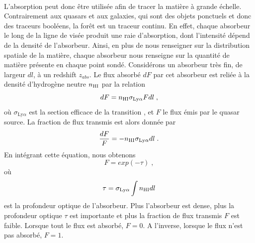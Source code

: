 \documentclass[11pt, twoside, a4paper, openright]{report}
\begin{document}
\paragraph{}
L'absorption \lya{} peut donc être utilisée afin de tracer la matière à grande échelle. Contrairement aux quasars et aux galaxies, qui sont des objets ponctuels et donc des traceurs booléens, la forêt \lya{} est un traceur continu. En effet, chaque absorbeur le long de la ligne de visée produit une raie d'absorption, dont l'intensité dépend de la densité de l'absorbeur. Ainsi, en plus de nous renseigner sur la distribution spatiale de la matière, chaque absorbeur nous renseigne sur la quantité de matière présente en chaque point sondé.
Considérons un absorbeur très fin, de largeur $dl$, à un redshift $z_{abs}$. Le flux absorbé $dF$ par cet absorbeur est reliée à la densité d'hydrogène neutre $n_{\textsc{HI}}$ par la relation
\begin{equation}
  dF = n_{\textsc{HI}} \sigma_{\mathrm{Ly}\alpha} F dl  \; ,
\end{equation}
où $\sigma_{\mathrm{Ly}\alpha}$ est la section efficace de la transition \lya{}, et $F$ le flux émis par le quasar source.
La fraction de flux transmis est alors donnée par
\begin{equation}
 \frac{dF}{F} = - n_{\textsc{HI}} \sigma_{\mathrm{Ly}\alpha} dl  \; .
\end{equation}
En intégrant cette équation, nous obtenons
\begin{equation}
  \label{eq:tff}
  F = exp(- \tau) \; ,
\end{equation}
où
\begin{equation}
  \label{eq:tau}
  \tau = \sigma_{\mathrm{Ly}\alpha} \int n_{\textsc{HI}}   dl
\end{equation}
est la profondeur optique de l'absorbeur. Plus l'absorbeur est dense, plus la profondeur optique $\tau$ est importante et plus la fraction de flux transmis $F$ est faible. Lorsque tout le flux est absorbé, $F = 0$. A l'inverse, lorsque le flux n'est pas absorbé, $F = 1$.
\end{document}
